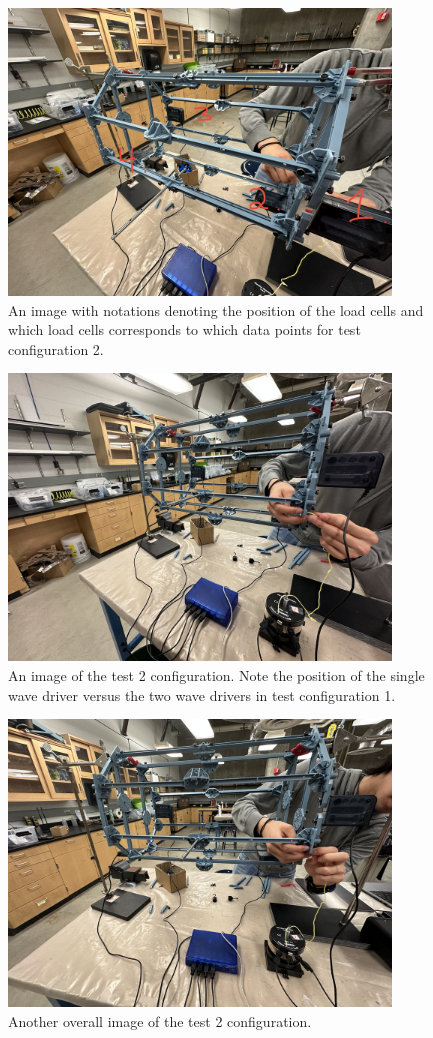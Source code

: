 \documentclass[12 pt]{report}
\begin{document}
\begin{figure}[htbp]
	\centering
	\includegraphics[width=4in]{images/IMG_1326}
	\caption{An image with notations denoting the position of the load cells and which load cells corresponds to which data points for test configuration \num{2}.}
	\label{fig:test2_app_1}
\end{figure}

\begin{figure}[htbp]
	\centering
	\includegraphics[width=4in]{images/IMG_1327}
	\caption{An image of the test \num{2} configuration. Note the position of the single wave driver versus the two wave drivers in test configuration \num{1}.}
	\label{fig:test2_app_2}
\end{figure}

\begin{figure}[htbp]
	\centering
	\includegraphics[width=4in]{images/IMG_1329}
	\caption{Another overall image of the test \num{2} configuration.}
	\label{fig:test2_app_3}
\end{figure}
\end{document}
